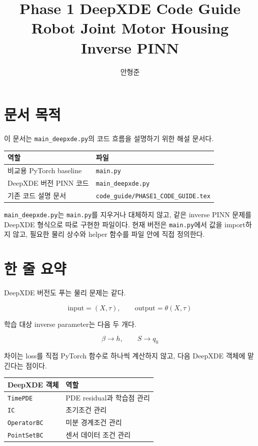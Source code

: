 \documentclass[11pt]{article}
\title{Phase 1 DeepXDE Code Guide\\
\large Robot Joint Motor Housing Inverse PINN}
\author{안형준}
\date{}
\begin{document}
\maketitle

\section{문서 목적}

이 문서는 \texttt{main\_deepxde.py}의 코드 흐름을 설명하기 위한 해설 문서다.

\begin{center}
\begin{tabular}{ll}
\toprule
역할 & 파일 \\
\midrule
비교용 PyTorch baseline & \texttt{main.py} \\
DeepXDE 버전 PINN 코드 & \texttt{main\_deepxde.py} \\
기존 코드 설명 문서 & \texttt{code\_guide/PHASE1\_CODE\_GUIDE.tex} \\
\bottomrule
\end{tabular}
\end{center}

\texttt{main\_deepxde.py}는 \texttt{main.py}를 지우거나 대체하지 않고, 같은 inverse PINN 문제를 DeepXDE 형식으로 따로 구현한 파일이다. 현재 버전은 \texttt{main.py}에서 값을 import하지 않고, 필요한 물리 상수와 helper 함수를 파일 안에 직접 정의한다.

\section{한 줄 요약}

DeepXDE 버전도 푸는 물리 문제는 같다.

\[
\text{input} = (X,\tau),
\qquad
\text{output} = \theta(X,\tau)
\]

학습 대상 inverse parameter는 다음 두 개다.

\[
\beta \rightarrow h,
\qquad
S \rightarrow q_0
\]

차이는 loss를 직접 PyTorch 함수로 하나씩 계산하지 않고, 다음 DeepXDE 객체에 맡긴다는 점이다.

\begin{center}
\begin{tabular}{ll}
\toprule
DeepXDE 객체 & 역할 \\
\midrule
\texttt{TimePDE} & PDE residual과 학습점 관리 \\
\texttt{IC} & 초기조건 관리 \\
\texttt{OperatorBC} & 미분 경계조건 관리 \\
\texttt{PointSetBC} & 센서 데이터 조건 관리 \\
\bottomrule
\end{tabular}
\end{center}
\end{document}

